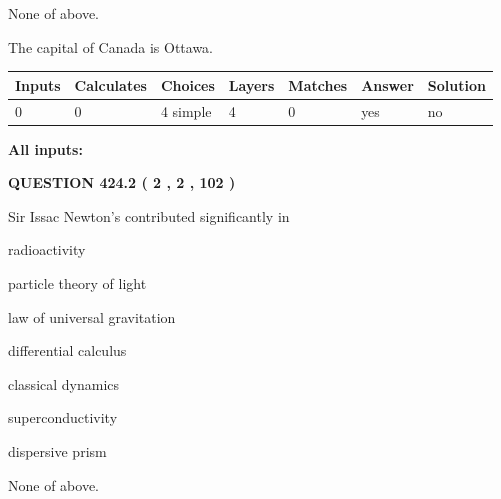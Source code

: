 \documentclass[12pt]{article}
\begin{document}
 
 None of above.
 
 
\noindent{}
 
 
The capital of Canada is Ottawa.
 
 
\noindent{}
 
 
   
   
   
   
\noindent\begin{tabular}{|l|l|l|l|l|l|l|}
 \hline
Inputs & Calculates & Choices & Layers & Matches & Answer & Solution \\ \hline
 0  & 
 0  & 
 4
  simple  
  & 
 4  & 
 0  & 
  yes & 
  no 
  \\ \hline
 \end{tabular}
   
   
   
   
\noindent{}
   
   
   
   
\noindent\vspace{0.1in}\hspace{-0.08in} {\textbf{\Large{All inputs: }}}
   
   
  
\vspace{0.2in}
  
{\textbf{\Large{QUESTION
424.2 
 ( 2 , 2 , 102 )
}}}
  
  
Sir Issac Newton's contributed significantly in
 
 
radioactivity
 
 
particle theory of light
 
 
law of universal gravitation
 
 
differential calculus
 
 
classical dynamics
 
 
superconductivity
 
 
dispersive prism
 
 
 None of above.
 
 
\noindent{}
 
\end{document}
